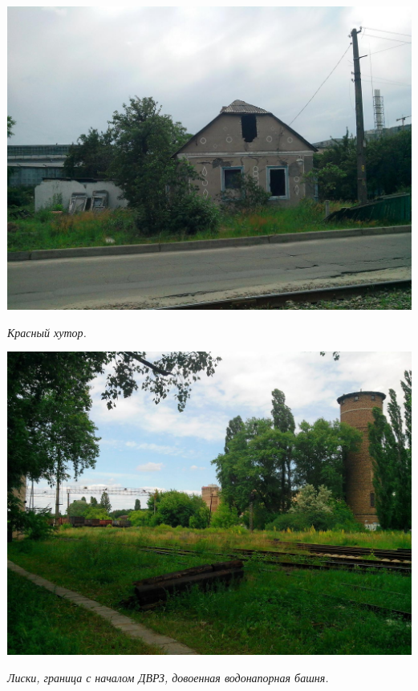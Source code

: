 \begin{center}
\includegraphics[width=\linewidth]{lpix/IMG_20160613_152456.jpg}

\textit{Красный хутор.}
\end{center}


\begin{center}
\includegraphics[width=0.95\linewidth]{lpix/IMG_20160613_134918.jpg}

\textit{Лиски, граница с началом ДВРЗ, довоенная водонапорная башня.}
\end{center}



